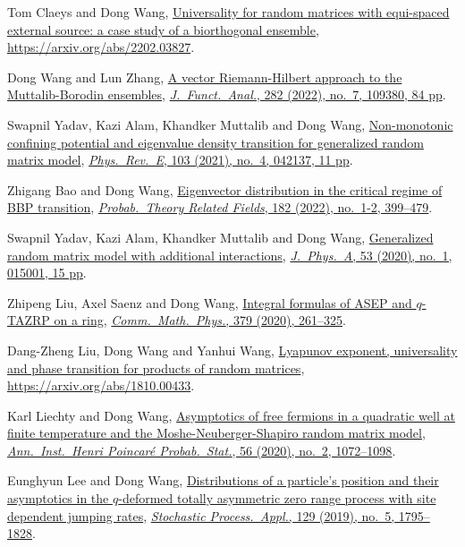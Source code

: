\documentclass[12pt, a4paper]{article}
\begin{document}
\begin{etaremune}
\item
  Tom Claeys and Dong Wang, \href{https://arxiv.org/abs/2202.03827}{Universality for random matrices with equi-spaced external source: a case study of a biorthogonal ensemble}, \url{https://arxiv.org/abs/2202.03827}.
\item
  Dong Wang and Lun Zhang, \href{https://arxiv.org/abs/2103.10327}{A vector Riemann-Hilbert approach to the Muttalib-Borodin ensembles}, \href{https://doi.org/10.1016/j.jfa.2021.109380}{\textit{J.\ Funct.\ Anal.}, 282 (2022), no.\ 7, 109380, 84 pp}.
\item
  Swapnil Yadav, Kazi Alam, Khandker Muttalib and Dong Wang, \href{https://arxiv.org/abs/2010.08856}{Non-monotonic confining potential and eigenvalue density transition for generalized random matrix model}, \href{https://doi.org/10.1103/PhysRevE.103.042137}{\textit{Phys.\ Rev.\ E}, 103 (2021), no.\ 4, 042137, 11 pp}.
\item
  Zhigang Bao and Dong Wang, \href{https://arxiv.org/abs/2009.13143}{Eigenvector distribution in the critical regime of BBP transition}, \href{https://doi.org/10.1007/s00440-021-01062-4}{\textit{Probab.\ Theory  Related Fields}, 182 (2022), no.\ 1-2, 399--479}.
\item
  Swapnil Yadav, Kazi Alam, Khandker Muttalib and Dong Wang, \href{https://arxiv.org/abs/1908.03726}{Generalized random matrix model with additional interactions}, \href{https://dx.doi.org/10.1088/1751-8121/ab56e0}{\textit{J.\ Phys.\ A}, 53 (2020), no.\ 1, 015001, 15 pp}.
\item
  Zhipeng Liu, Axel Saenz and Dong Wang, \href{https://arxiv.org/abs/1905.02987}{Integral formulas of ASEP and $q$-TAZRP on a ring}, \href{https://doi.org/10.1007/s00220-020-03837-7}{\textit{Comm.\ Math.\ Phys.}, 379 (2020), 261--325}.
\item
  Dang-Zheng Liu, Dong Wang and Yanhui Wang, \href{https://arxiv.org/abs/1810.00433}{Lyapunov exponent, universality and phase transition for products of random matrices}, \url{https://arxiv.org/abs/1810.00433}.
\item
  Karl Liechty and Dong Wang, \href{https://arxiv.org/abs/1706.06653}{Asymptotics of free fermions in a quadratic well at finite temperature and the Moshe-Neuberger-Shapiro random matrix model}, \href{https://doi.org/10.1214/19-AIHP994}{\textit{Ann.\ Inst.\ Henri Poincar\'{e} Probab.\ Stat.}, 56 (2020), no.\ 2, 1072--1098}.
\item
  Eunghyun Lee and Dong Wang, \href{https://arxiv.org/abs/1703.08839}{Distributions of a particle's position and their asymptotics in the $q$-deformed totally asymmetric zero range process with site dependent jumping rates}, \href{https://doi.org/10.1016/j.spa.2018.06.005}{\textit{Stochastic Process.\ Appl.}, 129 (2019), no.\ 5, 1795--1828}.

\end{etaremune}
\end{document}
